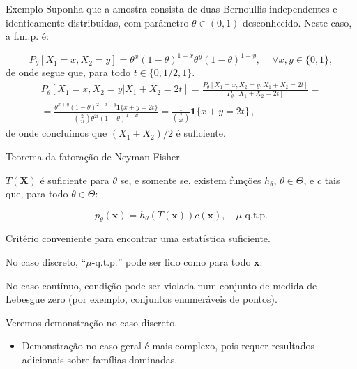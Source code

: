 \documentclass[11pt]{beamer}
\newenvironment{halfwideitemize}{\itemize\addtolength{\itemsep}{0.5em}}{\enditemize}
\begin{document}
	\begin{frame}{Exemplo}
		Suponha que a amostra consista de duas Bernoullis independentes e identicamente distribuídas, com parâmetro $\theta \in (0,1)$ desconhecido. Neste caso, a f.m.p. é:
		
		$$P_\theta[X_1 = x, X_2 = y] = \theta^x (1-\theta)^{1-x} \theta^y (1-\theta)^{1-y},\, \quad \forall x,y \in \{0,1\},$$
		de onde segue que, para todo $t \in \{0,1/2,1\}$.
		\begin{equation*}
			\begin{aligned}         
				P_\theta[X_1 = x, X_2 = y| X_1 +  X_2 =  2 t] = \frac{P_\theta[X_1 = x, X_2 = y, X_1 +  X_2 =  2 t]}{P_\theta[X_1 +  X_2 =  2 t]} = \\
				= \frac{\theta^{x+y} (1-\theta)^{2-x-y}\mathbf{1}\{x+y = 2t\}}{\binom{2}{2t} \theta^{2t}(1-\theta)^{1-2t}}= \frac{1}{\binom{2}{2t} } \mathbf{1}\{x+y = 2t\} \, ,
			\end{aligned}
		\end{equation*}
		de onde concluímos que $(X_1+X_2)/2$ é suficiente.
	\end{frame}
	\begin{frame}{Teorema da fatoração de Neyman-Fisher}
		\begin{theorem}
			$T(\boldsymbol{X})$ é suficiente para $\theta$ se, e somente se, existem funções $h_\theta$, $\theta \in \Theta$, e $c$ tais que, para todo $\theta \in \Theta$:
			
			$$p_\theta(\boldsymbol{x}) = h_\theta(T(\boldsymbol{x}) )c(\boldsymbol{x}), \quad \mu\text{-q.t.p.}$$
		\end{theorem}
		
		\begin{halfwideitemize}
			\item Critério conveniente para encontrar uma estatística suficiente.
			\begin{halfwideitemize}
				\item No caso discreto, ``$\mu\text{-q.t.p.}$'' pode ser lido como para todo $\boldsymbol{x}$.
				\item No caso contínuo, condição pode ser violada num conjunto de medida de Lebesgue zero (por exemplo, conjuntos enumeráveis de pontos).
			\end{halfwideitemize}
			\item Veremos demonstração no caso discreto.
			\begin{itemize}
				\item Demonstração no caso geral é mais complexo, pois requer resultados adicionais sobre famílias dominadas.
			\end{itemize}
		\end{halfwideitemize}
		
	\end{frame}
	
\end{document}
